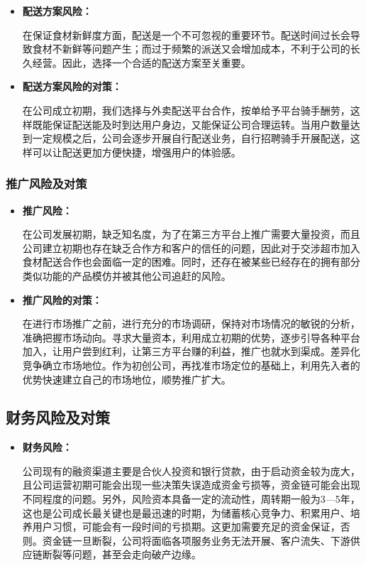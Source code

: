 \documentclass[UTF8,12pt]{ctexart}
\numberwithin{figure}{section}%
\begin{document}
\begin{spacing}{2}
\begin{itemize}
	\item \textbf{配送方案风险：}
	
	在保证食材新鲜度方面，配送是一个不可忽视的重要环节。配送时间过长会导致食材不新鲜等问题产生；而过于频繁的派送又会增加成本，不利于公司的长久经营。因此，选择一个合适的配送方案至关重要。
	
	\item \textbf{配送方案风险的对策：}
	
	在公司成立初期，我们选择与外卖配送平台合作，按单给予平台骑手酬劳，这样既能保证配送能及时到达用户身边，又能保证公司合理运转。当用户数量达到一定规模之后，公司会逐步开展自行配送业务，自行招聘骑手开展配送，这样可以让配送更加方便快捷，增强用户的体验感。
	
\end{itemize}
\subsubsection{推广风险及对策}

\begin{itemize}
	\item \textbf{推广风险：}
	
	在公司发展初期，缺乏知名度，为了在第三方平台上推广需要大量投资，而且公司建立初期也存在缺乏合作方和客户的信任的问题，因此对于交涉超市加入食材配送合作也会面临一定的困难。同时，还存在被某些已经存在的拥有部分类似功能的产品模仿并被其他公司追赶的风险。
	
	\item \textbf{推广风险的对策：}
	
	在进行市场推广之前，进行充分的市场调研，保持对市场情况的敏锐的分析，准确把握市场动向。寻求大量资本，利用成立初期的优势，逐步引导各种平台加入，让用户尝到红利，让第三方平台赚的利益，推广也就水到渠成。差异化竞争确立市场地位。作为初创公司，再找准市场定位的基础上，利用先入者的优势快速建立自己的市场地位，顺势推广扩大。
	
\end{itemize}
\subsection{财务风险及对策}

\begin{itemize}
	\item \textbf{财务风险：}
	
	公司现有的融资渠道主要是合伙人投资和银行贷款，由于启动资金较为庞大，且公司运营初期可能会出现一些决策失误造成资金亏损等，资金链可能会出现不同程度的问题。另外，风险资本具备一定的流动性，周转期一般为3—5年，这也是公司成长最关键也是最迅速的时期，为储蓄核心竞争力、积累用户、培养用户习惯，可能会有一段时间的亏损期。这更加需要充足的资金保证，否则。资金链一旦断裂，公司将面临各项服务业务无法开展、客户流失、下游供应链断裂等问题，甚至会走向破产边缘。
	

\end{itemize}
\end{spacing}
\end{document}
